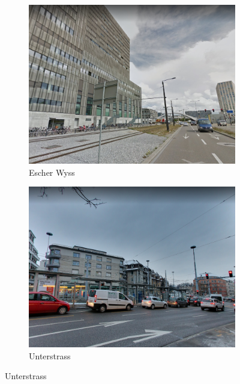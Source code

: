 \documentclass[letterpaper]{article}
\begin{document}
\begin{figure}[H]
    \centering
    \begin{subfigure}[t]{.45\columnwidth}
        \centering
        \includegraphics[width=\linewidth]{images/bad/Escher_Wyss.png}
        \caption[width=.9\linewidth]{Escher Wyss}
    \end{subfigure}\hspace{0.05\columnwidth}
    \begin{subfigure}[t]{.45\columnwidth}
        \centering
        \includegraphics[width=\linewidth]{images/bad/Unterstrass.png}
        \caption[width=.9\linewidth]{Unterstrass}
    \end{subfigure}\vspace{1mm}

\end{figure}
\end{document}
